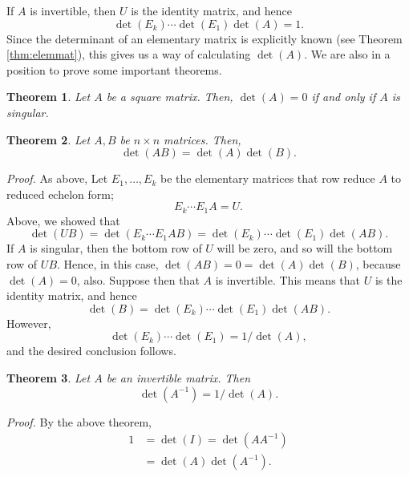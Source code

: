 \documentclass[12pt]{article}
\newtheorem{theorem}{Theorem}
\begin{document}
If $A$ is invertible, then $U$ is the identity matrix, and hence
\[ \det(E_k) \cdots \det(E_1) \det(A) = 1.\]
Since the determinant of an elementary matrix is explicitly known (see
Theorem \ref{thm:elemmat}), this
gives us a way of calculating $\det(A)$.
We are also in a position to prove  some important theorems.
\begin{theorem} Let $A$ be a square matrix.  Then, $\det(A)=0$ if
and only if $A$ is singular.
\end{theorem}
\begin{theorem}
  Let $A, B$ be $n\times n$ matrices.  Then, 
  \[ \det(AB) = \det(A) \det(B).\]
\end{theorem}
\noindent\emph{Proof.}  As above, Let $E_1, \ldots, E_k$ be the elementary
matrices that row reduce $A$ to reduced echelon form;
\[ E_k \cdots E_1 A = U. \]
Above, we showed that
\[ \det(UB) = \det(E_k \cdots E_1 A B) = \det(E_k) \cdots \det(E_1) \det(AB).\]
If $A$ is singular, then the bottom row of $U$ will be zero, and so
will the bottom row of $UB$.  Hence, in this case, $\det(AB)=0=\det(A)
\det(B)$, because $\det(A)=0$, also.  Suppose then that $A$ is
invertible.  This means that $U$ is the identity matrix, and hence
\[ \det(B) = \det(E_k) \cdots \det(E_1) \det(AB).\]
However,
\[ \det(E_k) \cdots \det(E_1) =1/\det(A),\]
and the desired conclusion follows.
\begin{theorem}
  Let $A$ be an invertible matrix.  Then 
  \[ \det(A^{-1}) = 1/\det(A).\]
\end{theorem}
\noindent
\emph{Proof.}
  By the above theorem,
  \begin{align*}
    1&= \det(I) = \det(A A^{-1}) \\
    &= \det(A) \det(A^{-1}).
  \end{align*}
\end{document}
